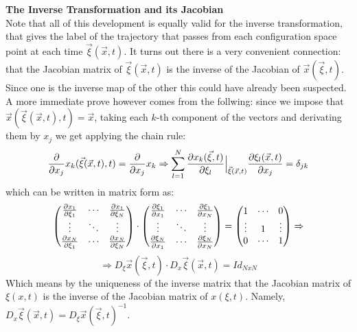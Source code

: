 \documentclass[11pt, a4paper]{article} %
\begin{document}
{{\bf The Inverse Transformation and its Jacobian\vspace{0.2cm}\\}
Note that all of this development is equally valid for the inverse transformation, that gives the label of the trajectory that passes from each configuration space point at each time $\vec{\xi}(\vec{x},t)$. It turns out there is a very convenient connection: that the Jacobian matrix of $\vec{\xi}(\vec{x},t)$ is the inverse of the Jacobian of $\vec{x}(\vec{\xi},t)$. Since one is the inverse map of the other this could have already been suspected. A more immediate prove however comes from the follwing: since we impose that $\vec{x}(\vec{\xi}(\vec{x},t),t)=\vec{x}$, taking each $k$-th component of the vectors and derivating them by $x_j$ we get applying the chain rule:
\begin{equation}
\pdv{}{x_j}x_k(\vec{\xi}(\vec{x},t),t)=\pdv{}{x_j}x_k \Rightarrow \sum_{l=1}^N \pdv{x_k(\vec{\xi},t)}{\xi_l}\Big\rvert_{\vec{\xi}(\vec{x},t)}\pdv{\xi_l(\vec{x},t)}{x_j}=\delta_{jk}
\end{equation}
which can be written in matrix form as:
\begin{equation}\label{inverse}
\begin{pmatrix}
\pdv{x_1}{\xi_1}&\cdots&\pdv{x_1}{\xi_N} \\
\vdots &\ddots& \vdots \\
\pdv{x_N}{\xi_1}&\cdots&\pdv{x_N}{\xi_N}
\end{pmatrix}\cdot \begin{pmatrix}
\pdv{\xi_1}{x_1}&\cdots&\pdv{\xi_1}{x_N} \\
\vdots & \ddots & \vdots \\
\pdv{\xi_N}{x_1}&\cdots&\pdv{\xi_N}{x_N}
\end{pmatrix}=\begin{pmatrix}
1&\cdots &0 \\
\vdots & 1& \vdots \\
0&\cdots &1
\end{pmatrix}\Rightarrow
\end{equation}
$$
\Rightarrow D_\xi \vec{x}(\vec{\xi},t)\cdot D_x \vec{\xi}(\vec{x},t) = Id_{NxN}
$$
Which means by the uniqueness of the inverse matrix that the Jacobian matrix of $\xi(x,t)$ is the inverse of the Jacobian matrix of $x(\xi,t)$. Namely, $D_x \vec{\xi}(\vec{x},t)=D_\xi \vec{x}(\vec{\xi},t)^{-1}$.
}
\end{document}
